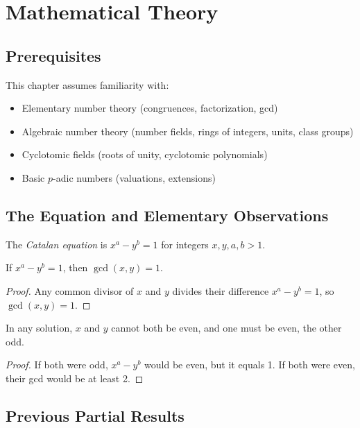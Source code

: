 \section{Mathematical Theory}


\subsection{Prerequisites}
This chapter assumes familiarity with:
\begin{itemize}
\item Elementary number theory (congruences, factorization, gcd)
\item Algebraic number theory (number fields, rings of integers, units, class groups)
\item Cyclotomic fields (roots of unity, cyclotomic polynomials)
\item Basic $p$-adic numbers (valuations, extensions)
\end{itemize}

\subsection{The Equation and Elementary Observations}

\begin{definition}
The \emph{Catalan equation} is $x^a - y^b = 1$ for integers $x, y, a, b > 1$.
\end{definition}

\begin{lemma}
If $x^a - y^b = 1$, then $\gcd(x, y) = 1$.
\end{lemma}
\begin{proof}
Any common divisor of $x$ and $y$ divides their difference $x^a - y^b = 1$, so $\gcd(x, y) = 1$.
\end{proof}

\begin{lemma}
In any solution, $x$ and $y$ cannot both be even, and one must be even, the other odd.
\end{lemma}
\begin{proof}
If both were odd, $x^a - y^b$ would be even, but it equals 1. If both were even, their gcd would be at least 2.
\end{proof}

\subsection{Previous Partial Results}

